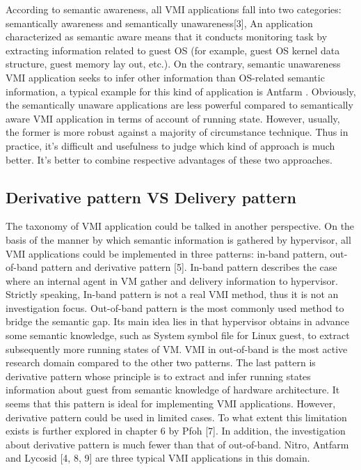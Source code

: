 According to semantic awareness, all VMI applications fall into two categories: semantically awareness and semantically unawareness[3], An application characterized as semantic aware means that it conducts monitoring task by extracting information related to guest OS (for example, guest OS kernel data structure, guest memory lay out, etc.). On the contrary, semantic unawareness VMI application seeks to infer other information than OS-related semantic information, a typical example for this kind of application is Antfarm  \citep{Reference4}. Obviously, the semantically unaware applications are less powerful compared to semantically aware VMI application in terms of account of running state. However, usually, the former is more robust against a majority of circumstance technique. Thus in practice, it’s difficult and usefulness to judge which kind of approach is much better. It’s better to combine respective advantages of these two approaches.

\subsection{Derivative pattern VS Delivery pattern}

The taxonomy of VMI application could be talked in another perspective. On the basis of the manner by which semantic information is gathered by hypervisor, all VMI applications could be implemented in three patterns: in-band pattern, out-of-band pattern and derivative pattern [5]. In-band pattern describes the case where an internal agent in VM gather and delivery information to hypervisor. Strictly speaking, In-band pattern is not a real VMI method, thus it is not an investigation focus. Out-of-band pattern is the most commonly used method to bridge the semantic gap. Its main idea lies in that hypervisor obtains in advance some semantic knowledge, such as System symbol file for Linux guest, to extract subsequently more running states of VM. VMI in out-of-band is the most active research domain compared to the other two patterns. The last pattern is derivative pattern whose principle is to extract and infer running states information about guest from semantic knowledge of hardware architecture. It seems that this pattern is ideal for implementing VMI applications. However, derivative pattern could be used in limited cases. To what extent this limitation exists is further explored in chapter 6 by Pfoh [7]. In addition, the investigation about derivative pattern is much fewer than that of out-of-band. Nitro, Antfarm and Lycosid [4, 8, 9] are three typical VMI applications in this domain.

